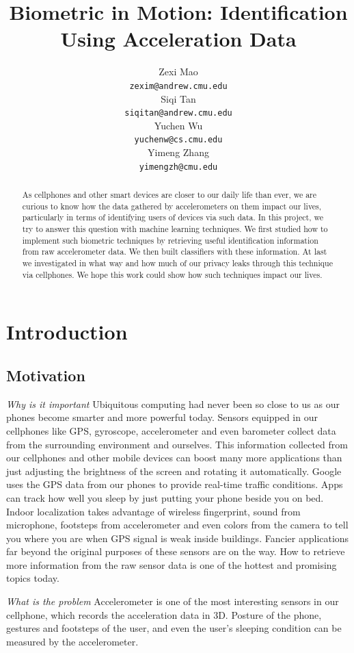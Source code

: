 \documentclass{article} %
\title{Biometric in Motion: Identification Using Acceleration Data}
\author{
Zexi Mao\\
\texttt{zexim@andrew.cmu.edu} \\
\And
Siqi Tan \\
\texttt{siqitan@andrew.cmu.edu} \\
\AND
Yuchen Wu\\
\texttt{yuchenw@cs.cmu.edu} \\
\And
Yimeng Zhang \\
\texttt{yimengzh@cmu.edu} \\
}
\begin{document}
\maketitle

\begin{abstract}
As cellphones and other smart devices are closer to our daily life than ever, we are curious to know how the data gathered by accelerometers on them impact our lives, particularly in terms of identifying users of devices via such data. In this project, we try to answer this question with machine learning techniques. We first studied how to implement such biometric techniques by retrieving useful identification information from raw accelerometer data. We then built classifiers with these information. At last we investigated in what way and how much of our privacy leaks through this technique via cellphones. We hope this work could show how such techniques impact our lives.
\end{abstract}

\section{Introduction}

\subsection{Motivation}

\emph{Why is it important} Ubiquitous computing had never been so close to us as our phones become smarter and more powerful today. Sensors equipped in our cellphones like GPS, gyroscope, accelerometer and even barometer collect data from the surrounding environment and ourselves. This information collected from our cellphones and other mobile devices can boost many more applications than just adjusting the brightness of the screen and rotating it automatically. Google uses the GPS data from our phones to provide real-time traffic conditions. Apps can track how well you sleep by just putting your phone beside you on bed. Indoor localization takes advantage of wireless fingerprint, sound from microphone, footsteps from accelerometer and even colors from the camera to tell you where you are when GPS signal is weak inside buildings. Fancier applications far beyond the original purposes of these sensors are on the way. How to retrieve more information from the raw sensor data is one of the hottest and promising topics today.

\emph{What is the problem} Accelerometer is one of the most interesting sensors in our cellphone, which records the acceleration data in 3D. Posture of the phone, gestures and footsteps of the user, and even the user's sleeping condition can be measured by the accelerometer.
\end{document}
